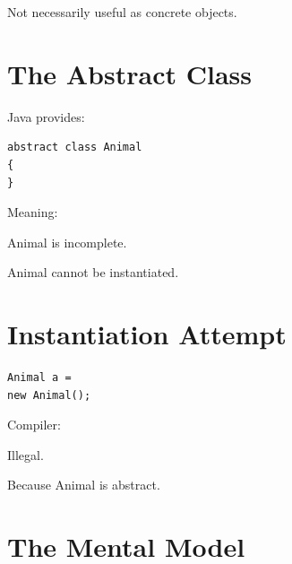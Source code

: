\documentclass[11pt,a4paper]{book}
\begin{document}

Not necessarily useful as concrete objects.


\section{The Abstract Class}

Java provides:

\begin{verbatim}
abstract class Animal
{
}
\end{verbatim}


Meaning:

\begin{center}
Animal is incomplete.
\end{center}


\begin{center}
Animal cannot be instantiated.
\end{center}



\section{Instantiation Attempt}

\begin{verbatim}
Animal a =
new Animal();
\end{verbatim}


Compiler:

\begin{center}
Illegal.
\end{center}


Because Animal is abstract.


\section{The Mental Model}
\end{document}
